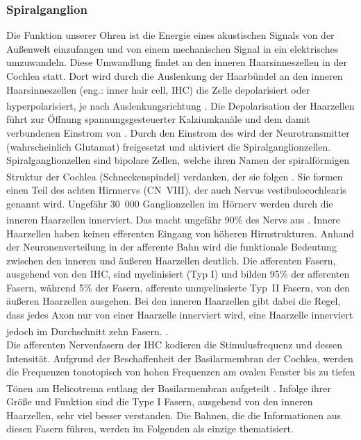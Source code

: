 \documentclass[12pt,a4paper,pdftex]{article}
\begin{document}
\subsubsection*{Spiralganglion}
Die Funktion unserer Ohren ist die Energie eines akustischen Signals von der Außenwelt einzufangen und von einem mechanischen Signal in ein elektrisches umzuwandeln. Diese Umwandlung findet an den inneren Haarsinneszellen in der Cochlea statt. Dort wird durch die Auslenkung der Haarbündel an den inneren Haarsinneszellen (eng.: inner hair cell, IHC)  die Zelle depolarisiert oder hyperpolarisiert, je nach Auslenkungsrichtung \textsuperscript{\cite[30]{kandel2013principles}}. Die Depolarisation der Haarzellen führt zur Öffnung spannungsgesteuerter Kalziumkanäle und dem damit verbundenen Einstrom von . Durch den Einstrom des  wird der Neurotransmitter (wahrscheinlich Glutamat) freigesetzt und aktiviert die Spiralganglionzellen. Spiralganglionzellen sind bipolare Zellen, welche ihren Namen der spiralförmigen Struktur der Cochlea (Schneckenspindel)  verdanken, der sie folgen \textsuperscript{\cite[11]{neurowissenschaften_baer}}. Sie formen einen Teil des achten Hirnnervs (CN~VIII), der auch Nervus vestibulocochlearis  genannt wird. Ungefähr 30~000 Ganglionzellen im Hörnerv werden durch die inneren Haarzellen innerviert. Das macht ungefähr 90\% des Nervs aus \textsuperscript{\cite[30]{kandel2013principles}}. 
Innere Haarzellen haben keinen efferenten Eingang von höheren Hirnstrukturen. Anhand der Neuronenverteilung in der afferente Bahn wird die funktionale Bedeutung zwischen den inneren und äußeren Haarzellen deutlich. Die afferenten Fasern, ausgehend von den IHC, sind myelinisiert (Typ I) und bilden 95\% der afferenten Fasern, während 5\% der Fasern, afferente unmyelinsierte Typ~II Fasern, von den äußeren Haarzellen ausgehen. Bei den inneren Haarzellen gibt dabei die Regel, dass jedes Axon nur von einer Haarzelle innerviert wird, eine Haarzelle innerviert jedoch im Durchschnitt zehn Fasern.  \textsuperscript{\cite[30]{kandel2013principles}}.   
\\
\noindent Die afferenten Nervenfasern der IHC kodieren die Stimulusfrequenz und dessen Intensität. Aufgrund der Beschaffenheit der Basilarmembran  der Cochlea, werden die Frequenzen tonotopisch von hohen Frequenzen am ovalen Fenster bis zu tiefen Tönen am Helicotrema  entlang der Basilarmembran aufgeteilt \textsuperscript{\cite[22]{paxinos2014rat}}. Infolge ihrer Größe und Funktion sind die Type I Fasern, ausgehend von den inneren Haarzellen, sehr viel besser verstanden. Die Bahnen, die die Informationen aus diesen Fasern führen, werden im Folgenden als einzige thematisiert.
\end{document}
